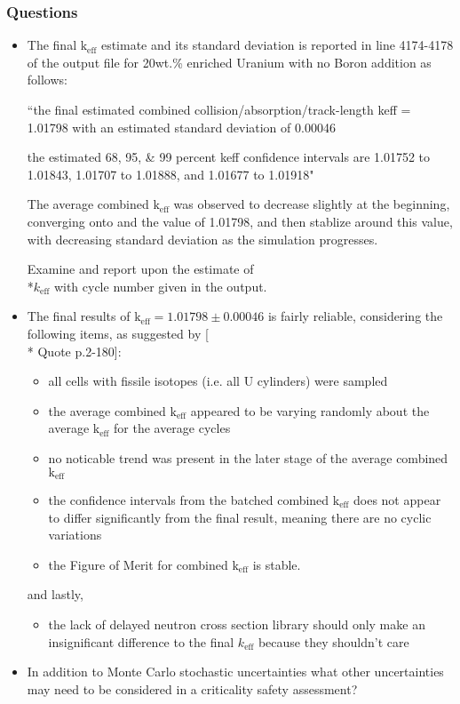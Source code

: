 \documentclass[a4paper, 12pt]{article}
\begin{document}
\subsubsection{Questions}
\begin{itemize}
	\item The final $\text{k}_{\text{eff}}$ estimate and its standard deviation is reported in line 4174-4178 of the output file for 20wt.\% enriched Uranium with no Boron addition as follows:
	
	``the final estimated combined collision/absorption/track-length keff = 1.01798 with an estimated standard deviation of 0.00046

 	the estimated 68, 95, \& 99 percent keff confidence intervals are 1.01752 to 1.01843, 1.01707 to 1.01888, and 1.01677 to 1.01918"

 	The average combined $\text{k}_{\text{eff}}$ was observed to decrease slightly at the beginning, converging onto and the value of 1.01798, and then stablize around this value, with decreasing standard deviation as the simulation progresses.

	Examine and report upon the estimate of \\*$k_{\text{eff}}$ with cycle number given in the output.
	\item The final results of $\text{k}_{\text{eff}} = 1.01798 \pm 0.00046$ is fairly reliable, considering the following items, as suggested by [\\* Quote p.2-180]:
	\begin{itemize}
		\item all cells with fissile isotopes (i.e. all U cylinders) were sampled
		\item the average combined $\text{k}_{\text{eff}}$ appeared to be varying randomly about the average $\text{k}_{\text{eff}}$ for the average cycles
		\item no noticable trend was present in the later stage of the average combined $\text{k}_{\text{eff}}$
		\item the confidence intervals from the batched combined $\text{k}_{\text{eff}}$ does not appear to differ significantly from the final result, meaning there are no cyclic variations
		\item the Figure of Merit for combined $\text{k}_{\text{eff}}$ is stable.
	\end{itemize}
	and lastly,
	\begin{itemize}
		\item the lack of delayed neutron cross section library should only make an insignificant difference to the final $k_{\text{eff}}$ because they shouldn't care
	\end{itemize}
	\item In addition to Monte Carlo stochastic uncertainties what other uncertainties may need 
	to be considered in a criticality safety assessment?
\end{itemize}
\end{document}

